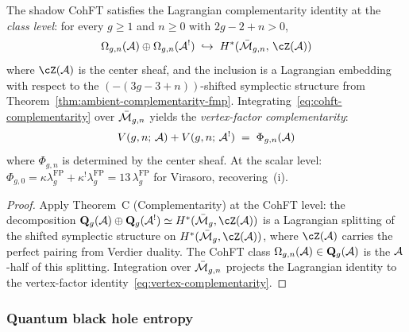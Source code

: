 \begin{proposition}%
\label{prop:cohft-complementarity}%
\ClaimStatusProvedHere%
%
The shadow CohFT satisfies the Lagrangian complementarity
identity at the \emph{class level}: for every
$g \geq 1$ and $n \geq 0$ with $2g-2+n > 0$,
\begin{equation}\label{eq:cohft-complementarity}
\Omega_{g,n}(\cA) \oplus \Omega_{g,n}(\cA^!)
\;\hookrightarrow\;
H^*(\bar{\cM}_{g,n},\,\cZ(\cA))
\end{equation}
where $\cZ(\cA)$ is the center sheaf,
and the inclusion is a Lagrangian embedding
with respect to the $({-}(3g{-}3{+}n))$-shifted
symplectic structure from
Theorem~\ref{thm:ambient-complementarity-fmp}.
Integrating~\eqref{eq:cohft-complementarity}
over $\bar{\mathcal{M}}_{g,n}$ yields the
\emph{vertex-factor complementarity}:
\begin{equation}\label{eq:vertex-complementarity}
V(g,n;\,\mathcal{A}) + V(g,n;\,\mathcal{A}^!)
\;=\;
\Phi_{g,n}(\mathcal{A})
\end{equation}
where $\Phi_{g,n}$ is determined by the center sheaf.
At the scalar level:
$\Phi_{g,0} = \kappa \lambda_g^{\mathrm{FP}}
+ \kappa^!\lambda_g^{\mathrm{FP}}
= 13\,\lambda_g^{\mathrm{FP}}$
for Virasoro, recovering~\textup{(i)}.
\end{proposition}

\begin{proof}
Apply Theorem~C (Complementarity)
at the CohFT level: the decomposition
$\mathbf{Q}_g(\cA) \oplus \mathbf{Q}_g(\cA^!)
\simeq H^*(\bar{\cM}_g, \cZ(\cA))$
is a Lagrangian splitting of the shifted symplectic
structure on $H^*(\bar{\cM}_g, \cZ(\cA))$, where
$\cZ(\cA)$ carries the perfect pairing from
Verdier duality. The CohFT class
$\Omega_{g,n}(\mathcal{A}) \in \mathbf{Q}_g(\mathcal{A})$ is
the $\mathcal{A}$-half of this splitting.
Integration over $\bar{\mathcal{M}}_{g,n}$ projects
the Lagrangian identity to the vertex-factor
identity~\eqref{eq:vertex-complementarity}.
\end{proof}

\subsubsection{Quantum black hole entropy}
\label{subsubsec:quantum-bh-entropy}


